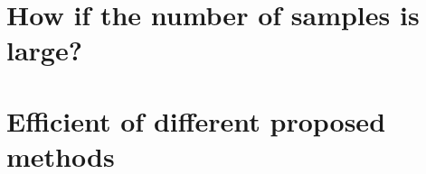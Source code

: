 \documentclass{article}
\begin{document}
\large

\tableofcontents
\newpage




\section{How if the number of samples is large?}
\section{Efficient of different proposed methods}

\newpage

\newpage

\newpage

\end{document}
